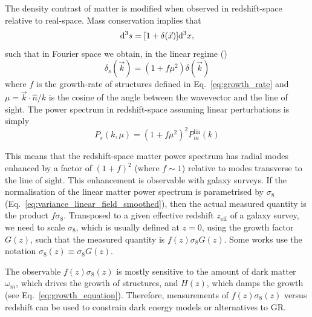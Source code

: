    The density contrast of matter is modified when observed in redshift-space relative 
    to real-space. Mass conservation implies that
    \begin{equation}
        [1+\delta_s(\vec{s})] \dinteg^3s = [1+\delta(\vec{x})]\dinteg^3 x,
        \label{eq:mass_conservation}
    \end{equation}
    such that in Fourier space we obtain, in the linear regime 
    (\cite{kaiserClusteringRealSpace1987})
    \begin{equation}
        \delta_s(\vec{k}) = (1 + f \mu^2 )\delta(\vec{k})
        \label{eq:delta_rsd_fourier}
    \end{equation}
    where $f$ is the growth-rate of structures defined in Eq.~\ref{eq:growth_rate} 
    and $\mu = \vec{k} \cdot \hat{n} / k$ is the cosine of the angle between the wavevector 
    and the line of sight. 
    The power spectrum in redshift-space assuming linear 
    perturbations is simply 
    \begin{equation}
        P_s(k, \mu) = (1 + f\mu^2)^2 P_m^\mathrm{lin}(k)
        \label{eq:power_spectrum_rsd_linear}
    \end{equation}
    
    This means that the redshift-space matter power spectrum has radial modes enhanced 
    by a factor of $(1+f)^2$ (where $f \sim 1$) relative to modes transverse to the line 
    of sight. This enhancement is observable with galaxy surveys. If the normalisation 
    of the linear matter power spectrum is parametrised by $\sigma_8$ 
    (Eq.~\ref{eq:variance_linear_field_smoothed}), then the actual measured quantity is 
    the product $f\sigma_8$. Transposed to a given effective redshift $z_\mathrm{eff}$
    of a galaxy survey, we need to scale $\sigma_8$, which is usually defined at $z=0$, 
    using the growth factor $G(z)$, such that the measured quantity is $f(z)\sigma_8 G(z)$.
    Some works use the notation $\sigma_8(z) \equiv \sigma_8 G(z)$. 
    
    The observable $f(z)\sigma_8(z)$ is mostly sensitive to the amount of 
    dark matter $\omega_m$, which drives the growth of structures, 
    and $H(z)$, which damps the growth (see Eq.~\ref{eq:growth_equation}). 
    Therefore, measurements of $f(z) \sigma_8(z)$ versus redshift can be 
    used to constrain dark energy models or alternatives to GR.

